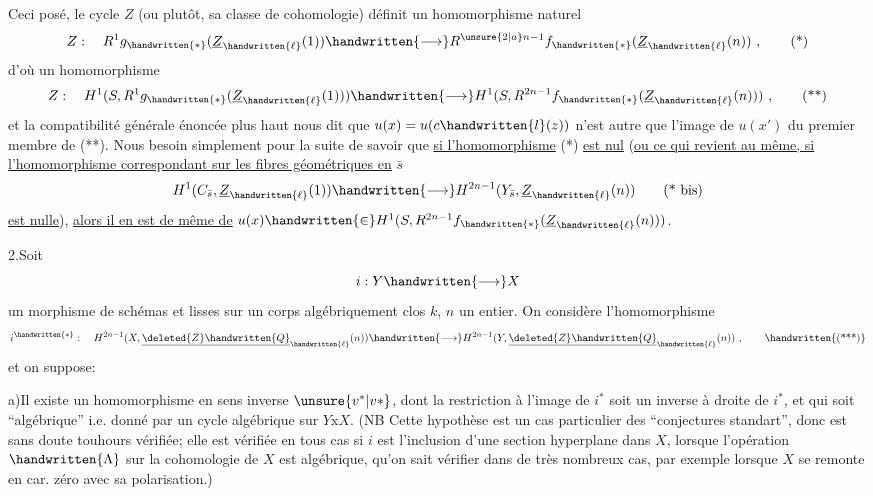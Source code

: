 Ceci posé, le cycle $Z$ (ou plutôt, sa classe de cohomologie) définit un homomorphisme naturel
\[
Z:\quad R^1g_{\handwritten{*}}(\underline{Z}_{\handwritten{\ell}}(1))\handwritten{\longrightarrow}R^{\unsure{2|a}n-1}f_{\handwritten{*}}(\underline{Z}_{\handwritten{\ell}}(n))\ ,\tag*{(*)}
\]
d'où un homomorphisme
\[
Z:\quad H^1(S,R^1g_{\handwritten{*}}(\underline{Z}_{\handwritten{\ell}}(1)))\handwritten{\longrightarrow}H^1(S,R^{2n-1}f_{\handwritten{*}}(\underline{Z}_{\handwritten{\ell}}(n)))\ ,\tag*{(**)}
\]
et la compatibilité générale énoncée plus haut nous dit que $u(x)=u(c\handwritten{l}(z))$ n'est autre que l'image de $u(x')$ du premier membre de  (**). Nous  besoin simplement pour la suite de savoir que \uline{si l'homomorphisme} (*) \uline{est nul} (\uline{ou ce qui revient au même, si l'homomorphisme correspondant sur les fibres géométriques en} $\bar s$ 
\[
H^1(C_{\bar s},\underline{Z}_{\handwritten{\ell}}(1))\handwritten{\longrightarrow}H^{2n-1}(Y_{\bar s},\underline{Z}_{\handwritten{\ell}}(n))\tag*{(* bis)}
\]
\uline{est nulle}), \uline{alors il en est de même de} $u(x)\handwritten{\in}H^1(S,R^{2n-1}f_{\handwritten{*}}(\underline{Z}_{\handwritten{\ell}}(n)))$.

2.\quad Soit
\[
i:Y\handwritten{\longrightarrow}X
\]
un morphisme de schémas  et lisses sur un corps algébriquement clos $k$, $n$ un entier. On  considère l'homomorphisme
\[
i^{\handwritten{*}}:\quad H^{2n-1}(X,\underline{\deleted{Z}\handwritten{Q}}_{\handwritten{\ell}}(n))\handwritten{\longrightarrow}H^{2n-1}(Y,\underline{\deleted{Z}\handwritten{Q}}_{\handwritten{\ell}}(n))\ ,\tag*{\handwritten{(***)}}
\]
et on suppose:

a)\quad Il existe un homomorphisme en sens inverse $\unsure{v^*|v*}$, dont la restriction à l'image de $i^*$ soit un inverse à droite de $i^*$, et qui soit ``algébrique'' i.e. donné par un cycle algébrique sur $Y\mathbin{\mathrm{x}}X$. (NB Cette hypothèse est un cas particulier des ``conjectures standart'', donc est sans doute touhours vérifiée; elle est vérifiée en tous cas si $i$ est l'inclusion d'une section hyperplane dans $X$, lorsque l'opération $\handwritten{\Lambda}$ sur  la cohomologie de $X$ est algébrique,   qu'on sait vérifier dans de très nombreux cas, par exemple lorsque $X$ se remonte en car. zéro avec sa polarisation.)
